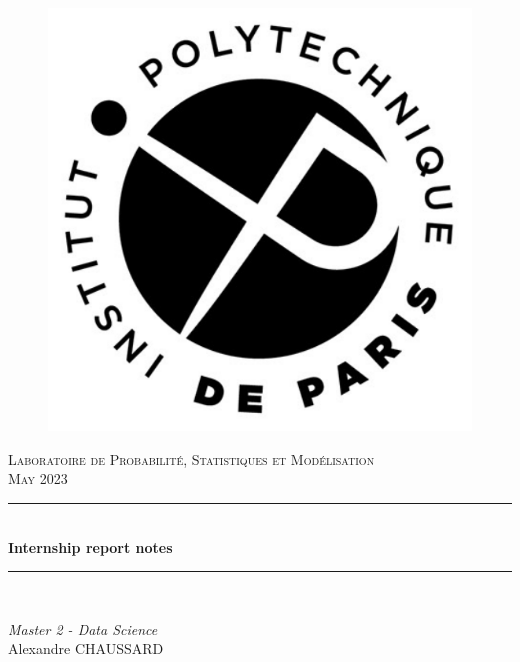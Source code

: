 \newcommand{\HRule}{\rule{\linewidth}{0.5mm}} 		
\begin{titlepage}
    \begin{center}

        \center 
        \begin{figure}[H]
            \centering
            \includegraphics[width=.5\textwidth]{images/logo_ipp.png}\label{fig:logo_ipp}
        \end{figure}
        
        \textsc{Laboratoire de Probabilité, Statistiques et Modélisation}\\[0.5cm]
        \textsc{\large May 2023}\\[2cm] 
        
        \HRule \\[1cm]
        { \huge \bfseries Internship report notes}\\[1cm]			
        \HRule \\[.5cm]
        \large

        \vspace*{1cm}
        
        \emph{Master 2 - Data Science} \\[1cm]

        Alexandre CHAUSSARD  \\ [0.5cm]
        
    \end{center}
\end{titlepage}

\newpage
\tableofcontents
\newpage